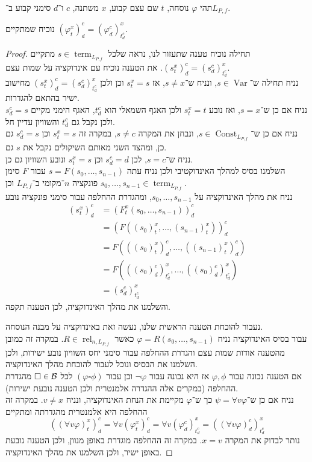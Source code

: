 \question{}
תהי $\varphi$ נוסחה, $t$ שם עצם קבוע, $x$ משתנה, $c$ ו־$d$ סימני קבוע ב־$L_{P, f}$.

\subquestion{}
נוכיח שמתקיים ${(\varphi_t^x)}_d^c = {(\varphi_d^c)}_{t_d^c}^x$.
\begin{proof}
	תחילה נוכיח טענה שתעזור לנו, נראה שלכל $s \in \operatorname{term}_{L_{P, f}}$ מתקיים ${(s_t^x)}_d^c = {(s_d^c)}_{t_d^c}^x$.
	את הטענה נוכיח עם אינדוקציה על שמות עצם. \\
	נניח תחילה ש־$s \in \operatorname{Var}$, ונניח ש־$s \ne x$, אז $s^x_t = s$ וכן ולכן ${(s_t^x)}_d^c = {(s_d^c)}_{t_d^c}^x$ מחישוב ישיר בהתאם להגדרות. \\
	נניח אם כן ש־$s = x$, ואז נובע $s_t^x = t$ ולכן האגף השמאלי הוא $t_d^c$, האגף הימני מקיים $s_d^c = s$ ולכן נקבל גם $t_d^c$ והשוויון עדיין חל. \\
	נניח אם כן ש־$s \in \operatorname{Const}_{L_{P, f}}$, ונבחן את המקרה $s \ne c$, במקרה זה $s_t^x = s$ וכן $s_d^c = s$ גם כן, ומהצד השני מאותם השיקולים נקבל את $s$ גם. \\
	נניח ש־$s = c$, לכן $s_d^c = d$ וכן $s_t^x = s$ ונובע השוויון גם כן. \\
	השלמנו בסיס למהלך האינדוקטיבי ולכן נניח עתה $s = F(s_0, \dots, s_{n - 1})$ עבור $F$ סימן פונקציה $n$־מקומי ב־$L_{P, f}$ וכן $s_0, \dots, s_{n - 1} \in \operatorname{term}_{L_{P, f}}$. \\
	נניח את מהלך האינדוקציה על $s_0, \dots, s_{n - 1}$, ומהגדרת ההחלפה עבור סימני פונקציה נובע
	\begin{align*}
		{(s_t^x)}_d^c
		& = {(F_t^x(s_0, \dots, s_{n - 1}))}_d^c \\
		& = {(F({(s_0)}_t^x, \dots, {(s_{n - 1})}_t^x))}_d^c \\
		& = F({({(s_0)}_t^x)}_d^c, \dots, {({(s_{n - 1})}_t^x)}_d^c) \\
		& = F({({(s_0)}_d^c)}_{t_d^c}^x, \dots, {({(s_0)}_d^c)}_{t_d^c}^x) \\
		& = {(s_d^c)}_{t_d^c}^x
	\end{align*}
	והשלמנו את מהלך האינדוקציה, לכן הטענה תקפה.

	נעבור להוכחת הטענה הראשית שלנו, נעשה זאת באינדוקציה על מבנה הנוסחה. \\
	עבור בסיס האינדוקציה נניח $\varphi = R(s_0, \dots, s_{n - 1})$ כאשר $R \in \operatorname{rel}_{n, L_{P, f}}$.
	במקרה זה כמובן מהטענה אודות שמות עצם והגדרת ההחלפה עבור סימני יחס השוויון נובע ישירות, ולכן השלמנו את הבסיס ונוכל לעבור להוכחת מהלך האינדוקציה. \\
	אם הטענה נכונה עבור $\varphi, \phi$ אז היא נכונה עבור $\lnot \varphi$ וכן עבור $(\varphi \square \phi)$ לכל $\square \in \mathcal{B}$ מהגדרת ההחלפה (במקרים אלה ההגדרה אלמנטרית ולכן הטענה נובעת ישירות). \\
	נניח אם כן ש־$\psi = \forall v \varphi$ כך ש־$\varphi$ מקיימת את הנחת האינדוקציה, ונניח $v \ne x$.
	במקרה זה ההחלפה היא אלמנטרית מהגדרתה ומתקיים
	\[
		{({(\forall v \varphi)}_t^x)}_d^c
		= \forall v {(\varphi_t^x)}_d^c
		= \forall v {(\varphi_d^c)}_{t_d^c}^x
		= {({(\forall v \varphi)}_d^c)}_{t_d^c}^x
	\]
	נותר לבדוק את המקרה $x = v$.
	במקרה זה ההחלפה מוגדרת באופן מנוון, ולכן הטענה נובעת באופן ישיר, ולכן השלמנו את מהלך האינדוקציה.
\end{proof}

